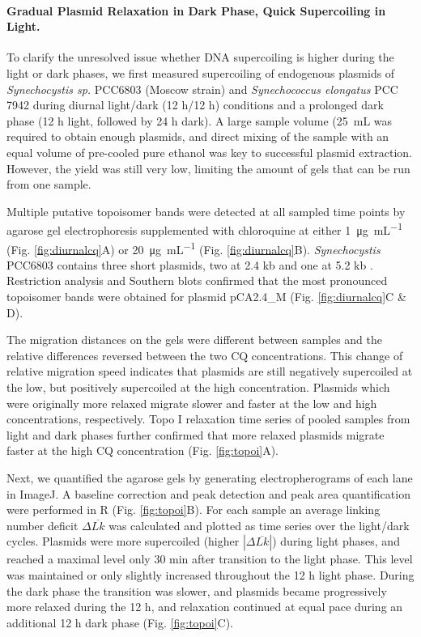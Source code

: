 \documentclass[10pt,letterpaper]{article}
\newcommand{\ugml}{\micro\gram\per\milli\liter}
\newcommand{\mL}{\milli\liter}
\newcommand{\scyst}{\textit{Synechocystis} PCC6803}
\newcommand{\raim}[1]{\begingroup{\color{purple}#1}\endgroup}
\begin{document}
\paragraph{Gradual Plasmid Relaxation in Dark Phase, Quick Supercoiling in
  Light.}  To clarify the unresolved issue whether DNA supercoiling is
higher during the light or dark phases, we first measured supercoiling
of endogenous plasmids of \textit{Synechocystis sp.} PCC6803 (Moscow
strain) \raim{and \textit{Synechococcus elongatus} PCC 7942} during
diurnal light/dark (12 h/12 h) conditions and a prolonged dark phase
(12 h light, followed by 24 h dark).  A large sample volume
(\SI{25}{\mL} was required to obtain enough plasmids, and direct
mixing of the sample with an equal volume of pre-cooled pure ethanol
was key to successful plasmid extraction. However, the yield was still
very low, limiting the amount of gels that can be run from one sample.

Multiple putative topoisomer bands were detected at all sampled time
points by agarose gel electrophoresis supplemented with chloroquine at
either \SI{1}{\ugml} (Fig. \ref{fig:diurnalcq}A) or \SI{20}{\ugml}
(Fig. \ref{fig:diurnalcq}B). \scyst{} contains three short
plasmids, two at 2.4 kb \cite{Yang1993b, Yang1994} and one at 5.2 kb
\cite{Xu1997b} . Restriction analysis and Southern blots confirmed
that the most pronounced topoisomer bands were obtained for plasmid
pCA2.4\_M (Fig. \ref{fig:diurnalcq}C \& D).

The migration distances on the gels were different between samples and
the relative differences reversed between the two CQ
concentrations. This change of relative migration speed indicates that
plasmids are still negatively supercoiled at the low, but positively
supercoiled at the high concentration. Plasmids which were originally
more relaxed migrate slower and faster at the low and high
concentrations, respectively.  Topo I relaxation time series of pooled
samples from light and dark phases further confirmed that more relaxed
plasmids migrate faster at the high CQ concentration
(Fig. \ref{fig:topoi}A).

Next, we quantified the agarose gels by generating electropherograms
of each lane in ImageJ. A baseline correction and peak detection and
peak area quantification were performed in R
(Fig. \ref{fig:topoi}B). For each sample an average linking
number deficit $\Delta \overline{Lk}$ was calculated and plotted as time series
over the light/dark cycles.  Plasmids were more supercoiled (higher
$|\Delta \overline{Lk}|$) during light phases, and reached a maximal level only
30 min after transition to the light phase. This level was maintained
or only slightly increased throughout the 12 h light phase.  During
the dark phase the transition was slower, and plasmids became
progressively more relaxed during the 12 h, and relaxation continued
at equal pace during an additional 12 h dark phase
(Fig. \ref{fig:topoi}C).
\end{document}
